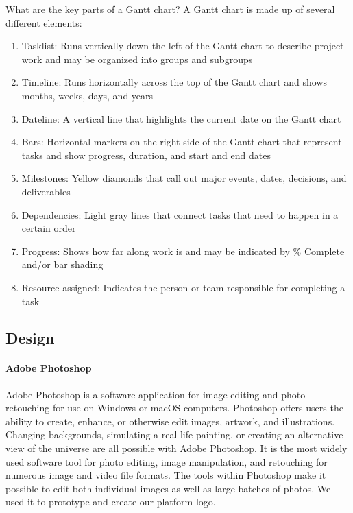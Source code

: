 What are the key parts of a Gantt chart?
A Gantt chart is made up of several different elements:
\begin{enumerate}
      \item
            Tasklist: Runs vertically down the left of the Gantt chart to describe project work and may be organized into groups and subgroups
      \item
            Timeline: Runs horizontally across the top of the Gantt chart and shows months, weeks, days, and years
      \item
            Dateline: A vertical line that highlights the current date on the Gantt chart
      \item
            Bars: Horizontal markers on the right side of the Gantt chart that represent tasks and show progress, duration, and start and end dates
      \item
            Milestones: Yellow diamonds that call out major events, dates, decisions, and deliverables
      \item
            Dependencies: Light gray lines that connect tasks that need to happen in a certain order
      \item
            Progress: Shows how far along work is and may be indicated by \% Complete and/or bar shading
      \item
            Resource assigned: Indicates the person or team responsible for completing a task
\end{enumerate}


\subsection{Design}
\paragraph{Adobe Photoshop}
Adobe Photoshop is a software application for image editing and photo retouching for use on Windows or macOS computers. Photoshop offers users the ability to create, enhance, or otherwise edit images, artwork, and illustrations. Changing backgrounds, simulating a real-life painting, or creating an alternative view of the universe are all possible with Adobe Photoshop. It is the most widely used software tool for photo editing, image manipulation, and retouching for numerous image and video file formats. The tools within Photoshop make it possible to edit both individual images as well as large batches of photos.
We used it to prototype and create our platform logo.
